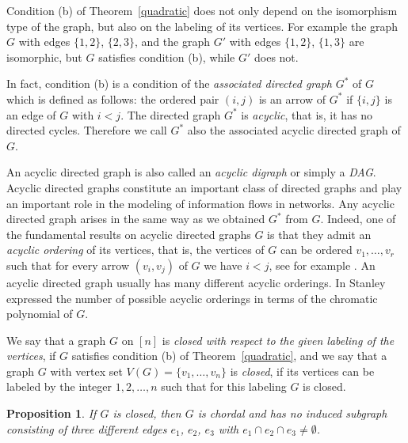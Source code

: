 \documentclass[11pt]{amsart}
\let\sect=\cap
\newtheorem{Proposition}[Theorem]{Proposition}
\begin{document}
Condition (b) of Theorem~\ref{quadratic} does not only depend on  the isomorphism type of the graph, but also on the labeling of its vertices. For example the  graph $G$ with edges $\{1,2\}$,  $\{2,3\}$, and  the graph $G'$ with edges $\{1,2\}$, $\{1, 3\}$ are isomorphic, but $G$ satisfies condition (b), while $G'$ does not.

In fact, condition (b) is a condition of the {\em associated directed graph} $G^*$ of $G$ which is defined as follows: the ordered pair $(i,j)$ is an arrow of $G^*$ if $\{i,j\}$ is an edge of $G$ with $i<j$. The directed graph $G^*$ is {\em acyclic}, that is, it has no directed cycles. Therefore we call $G^*$ also the associated acyclic directed graph of $G$.


An acyclic directed graph is also called an {\em acyclic digraph} or simply a {\em DAG}. Acyclic directed graphs constitute  an important class of directed graphs and play an important role in the modeling of information flows in networks. Any acyclic  directed graph arises in the same  way as we obtained $G^*$ from $G$. Indeed, one of the fundamental results on acyclic directed graphs $G$ is that they admit an {\em acyclic ordering} of its vertices, that is, the vertices of $G$ can be ordered $v_1,\ldots, v_r$ such that  for every arrow $(v_i,v_j)$ of $G$ we have $i<j$, see for example \cite[Proposition 1.4.3]{BG}. An acyclic directed graph usually has many different acyclic orderings. In \cite[Corollary 1.3]{St} Stanley expressed the number of possible acyclic orderings in terms of the chromatic polynomial of $G$.

We say that a graph $G$ on $[n]$ is {\em closed with respect to the given labeling of the vertices}, if $G$ satisfies condition (b) of  Theorem~\ref{quadratic}, and we say that a graph $G$ with vertex set $V(G)=\{v_1,\ldots,v_n\}$ is {\em closed}, if its vertices can be labeled by the integer $1,2,\ldots,n$ such that for this labeling $G$ is closed.



\begin{Proposition}
\label{hopefully} If $G$ is closed, then  $G$ is chordal and  has no induced  subgraph consisting of three different  edges  $e_1$,  $e_2$, $e_3$ with $e_1\sect e_2 \sect e_3\neq \emptyset$.
\end{Proposition}
\end{document}
